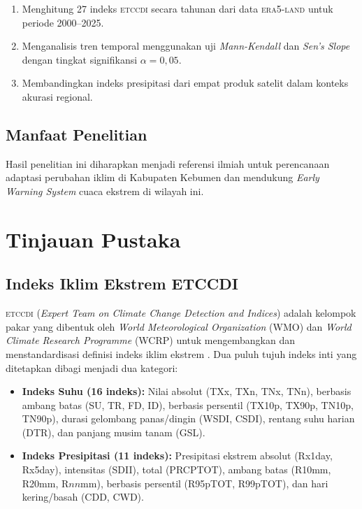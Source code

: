 \documentclass[12pt, a4paper]{article}
\newcommand{\etccdi}{\textsc{etccdi}}
\newcommand{\era}{\textsc{era5-land}}
\newcommand{\mk}{\textit{Mann-Kendall}}
\newcommand{\sens}{\textit{Sen's Slope}}
\begin{document}
\begin{enumerate}
  \item Menghitung 27 indeks \etccdi{} secara tahunan dari data \era{} untuk periode 2000--2025.
  \item Menganalisis tren temporal menggunakan uji \mk{} dan \sens{} dengan tingkat signifikansi $\alpha = 0{,}05$.
  \item Membandingkan indeks presipitasi dari empat produk satelit dalam konteks akurasi regional.
\end{enumerate}

\subsection{Manfaat Penelitian}

Hasil penelitian ini diharapkan menjadi referensi ilmiah untuk perencanaan adaptasi perubahan iklim di Kabupaten Kebumen dan mendukung \textit{Early Warning System} cuaca ekstrem di wilayah ini.

\section{Tinjauan Pustaka}

\subsection{Indeks Iklim Ekstrem ETCCDI}

\etccdi{} (\textit{Expert Team on Climate Change Detection and Indices}) adalah kelompok pakar yang dibentuk oleh \textit{World Meteorological Organization} (WMO) dan \textit{World Climate Research Programme} (WCRP) untuk mengembangkan dan menstandardisasi definisi indeks iklim ekstrem \citep{zhang2011}. Dua puluh tujuh indeks inti yang ditetapkan dibagi menjadi dua kategori:

\begin{itemize}
  \item \textbf{Indeks Suhu (16 indeks):} Nilai absolut (TXx, TXn, TNx, TNn), berbasis ambang batas (SU, TR, FD, ID), berbasis persentil (TX10p, TX90p, TN10p, TN90p), durasi gelombang panas/dingin (WSDI, CSDI), rentang suhu harian (DTR), dan panjang musim tanam (GSL).
  \item \textbf{Indeks Presipitasi (11 indeks):} Presipitasi ekstrem absolut (Rx1day, Rx5day), intensitas (SDII), total (PRCPTOT), ambang batas (R10mm, R20mm, R$nn$mm), berbasis persentil (R95pTOT, R99pTOT), dan hari kering/basah (CDD, CWD).
\end{itemize}
\end{document}
